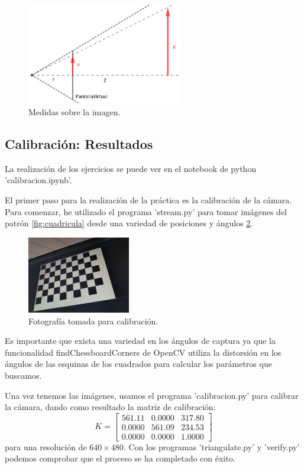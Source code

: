 \documentclass[12pt]{article}
\begin{document}
\begin{figure}[H]
    \centering
    \includegraphics[width=0.6\textwidth]{images_calibracion/Tales.png}  
    \caption{Medidas sobre la imagen.}
    \label{fig:Tales}
\end{figure}

\subsection{Calibración: Resultados}

La realización de los ejercicios se puede ver en el notebook de python 'calibracion.ipynb'. 

El primer paso para la realización de la práctica es la calibración de la cámara. 
Para comenzar, he utilizado el programa 'stream.py' para tomar imágenes del patrón \ref{fig:cuadricula} desde una variedad de posiciones y ángulos \ref{fig:calibracion}. 
\begin{figure}[H]
    \centering
    \includegraphics[width=0.4\textwidth]{images_calibracion/Calibracion.png}
    \caption{Fotografía tomada para calibración.}
    \label{fig:calibracion}
\end{figure}
Es importante que exista una variedad en los ángulos de captura ya que la funcionalidad findChessboardCorners de OpenCV utiliza la distorsión en los ángulos de las esquinas de los cuadrados para calcular los parámetros que buscamos.

Una vez tenemos las imágenes, usamos el programa 'calibracion.py' para calibrar la cámara, dando como resultado la matriz de calibración:
$$
K=
\begin{bmatrix}
    561.11 & 0.0000 & 317.80 \\
    0.0000 & 561.09 & 234.53 \\
    0.0000 & 0.0000 & 1.0000
\end{bmatrix}
$$
para una resolución de $640 \times 480$. Con los programas 'triangulate.py' y 'verify.py' podemos comprobar que el proceso se ha completado con éxito.
\end{document}
